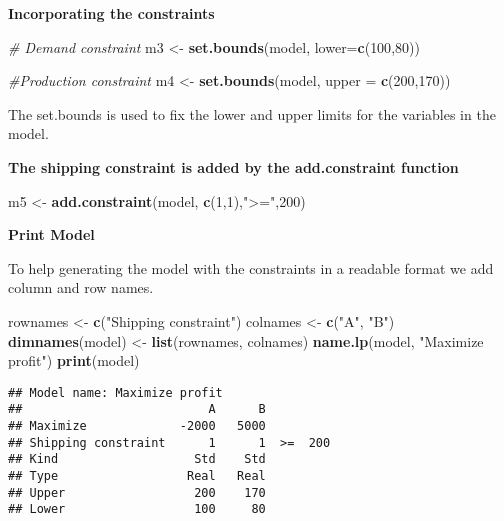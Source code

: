 \documentclass[]{article}
\newenvironment{Shaded}{\begin{snugshade}}{\end{snugshade}}
\newcommand{\KeywordTok}[1]{\textcolor[rgb]{0.13,0.29,0.53}{\textbf{{#1}}}}
\newcommand{\DataTypeTok}[1]{\textcolor[rgb]{0.13,0.29,0.53}{{#1}}}
\newcommand{\DecValTok}[1]{\textcolor[rgb]{0.00,0.00,0.81}{{#1}}}
\newcommand{\StringTok}[1]{\textcolor[rgb]{0.31,0.60,0.02}{{#1}}}
\newcommand{\CommentTok}[1]{\textcolor[rgb]{0.56,0.35,0.01}{\textit{{#1}}}}
\newcommand{\NormalTok}[1]{{#1}}
\begin{document}
\textbf{Incorporating the constraints}

\begin{Shaded}
\begin{Highlighting}[]
\CommentTok{# Demand constraint}
\NormalTok{m3 <-}\StringTok{ }\KeywordTok{set.bounds}\NormalTok{(model, }\DataTypeTok{lower=}\KeywordTok{c}\NormalTok{(}\DecValTok{100}\NormalTok{,}\DecValTok{80}\NormalTok{))}

\CommentTok{#Production constraint}
\NormalTok{m4 <-}\StringTok{ }\KeywordTok{set.bounds}\NormalTok{(model, }\DataTypeTok{upper =} \KeywordTok{c}\NormalTok{(}\DecValTok{200}\NormalTok{,}\DecValTok{170}\NormalTok{))}
\end{Highlighting}
\end{Shaded}

The set.bounds is used to fix the lower and upper limits for the
variables in the model.

\textbf{The shipping constraint is added by the add.constraint function}

\begin{Shaded}
\begin{Highlighting}[]
\NormalTok{m5 <-}\StringTok{ }\KeywordTok{add.constraint}\NormalTok{(model, }\KeywordTok{c}\NormalTok{(}\DecValTok{1}\NormalTok{,}\DecValTok{1}\NormalTok{),}\StringTok{">="}\NormalTok{,}\DecValTok{200}\NormalTok{)}
\end{Highlighting}
\end{Shaded}

\textbf{Print Model}

To help generating the model with the constraints in a readable format
we add column and row names.

\begin{Shaded}
\begin{Highlighting}[]
\NormalTok{rownames <-}\StringTok{ }\KeywordTok{c}\NormalTok{(}\StringTok{"Shipping constraint"}\NormalTok{)}
\NormalTok{colnames <-}\StringTok{ }\KeywordTok{c}\NormalTok{(}\StringTok{"A"}\NormalTok{, }\StringTok{"B"}\NormalTok{)}
\KeywordTok{dimnames}\NormalTok{(model) <-}\StringTok{ }\KeywordTok{list}\NormalTok{(rownames, colnames)}
\KeywordTok{name.lp}\NormalTok{(model, }\StringTok{"Maximize profit"}\NormalTok{)}
\KeywordTok{print}\NormalTok{(model)}
\end{Highlighting}
\end{Shaded}

\begin{verbatim}
## Model name: Maximize profit
##                          A      B         
## Maximize             -2000   5000         
## Shipping constraint      1      1  >=  200
## Kind                   Std    Std         
## Type                  Real   Real         
## Upper                  200    170         
## Lower                  100     80
\end{verbatim}
\end{document}
